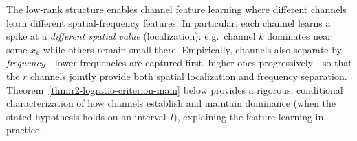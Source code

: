 \documentclass[nohyperref]{article}
\theoremstyle{plain}
\theoremstyle{definition}
\theoremstyle{remark}
\begin{document}
The low-rank structure enables channel feature learning where different channels learn different spatial-frequency features. In particular, each channel learns a spike at a \emph{different spatial value} (localization): e.g.\ channel $k$ dominates near some $x_k$ while others remain small there. Empirically, channels also separate by \emph{frequency}---lower frequencies are captured first, higher ones progressively---so that the $r$ channels jointly provide both spatial localization and frequency separation. Theorem~\ref{thm:r2-logratio-criterion-main} below provides a rigorous, conditional characterization of how channels establish and maintain dominance (when the stated hypothesis holds on an interval $I$), explaining the feature learning in practice.



\begin{figure}[htbp]
    \centering
\end{figure}
\end{document}
